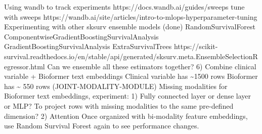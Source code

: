 \documentclass{article}%
\begin{document}
%
Using wandb to track experiments %
\newline%
\newline%
%
https://docs.wandb.ai/guides/sweeps tune with sweeps%
\newline%
\newline%
%
https://wandb.ai/site/articles/intro{-}to{-}mlops{-}hyperparameter{-}tuning %
\newline%
\newline%
%
Experimenting with other sksurv ensemble models (done) %
\newline%
\newline%
%
RandomSurvivalForest %
\newline%
\newline%
%
ComponentwiseGradientBoostingSurvivalAnalysis%
\newline%
\newline%
%
GradientBoostingSurvivalAnalysis%
\newline%
\newline%
%
ExtraSurvivalTrees%
\newline%
\newline%
%
https://scikit{-}survival.readthedocs.io/en/stable/api/generated/sksurv.meta.EnsembleSelectionRegressor.html Can we ensemble all these estimators together? %
\newline%
\newline%
%
6) Combine clinical variable + Bioformer text embeddings %
\newline%
\newline%
%
Clinical variable has \textasciitilde{}1500 rows %
\newline%
\newline%
%
Bioformer has \textasciitilde{} 550 rows %
\newline%
\newline%
%
(JOINT{-}MODALITY{-}MODULE) Missing modalities for Bioformer text embeddings, experiment:%
\newline%
\newline%
%
1) Fully connected layer or dense layer or MLP? To project rows with missing modalities to the same pre{-}defined dimension? %
\newline%
\newline%
%
2) Attention %
\newline%
\newline%
%
Once organized with bi{-}modality feature embeddings, use Random Survival Forest again to see performance changes. %
\newline%
\newline%
\end{document}
